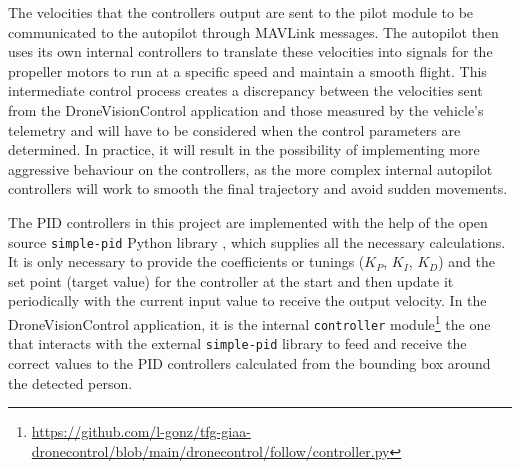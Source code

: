 The velocities that the controllers output are sent to the pilot module to be communicated to the autopilot through MAVLink messages. The autopilot then uses its own internal controllers to translate these velocities into signals for the propeller motors to run at a specific speed and maintain a smooth flight. This intermediate control process creates a discrepancy between the velocities sent from the DroneVisionControl application and those measured by the vehicle's telemetry and will have to be considered when the control parameters are determined. In practice, it will result in the possibility of implementing more aggressive behaviour on the controllers, as the more complex internal autopilot controllers will work to smooth the final trajectory and avoid sudden movements.


The PID controllers in this project are implemented with the help of the open source \texttt{simple-pid} Python library \cite{pid-library}, which supplies all the necessary calculations.
It is only necessary to provide the coefficients or tunings ($K_P$, $K_I$, $K_D$) and the set point (target value) for the controller at the start and then update it periodically with the current input value to receive the output velocity.
In the DroneVisionControl application, it is the internal \texttt{controller} module\footnote{\url{https://github.com/l-gonz/tfg-giaa-dronecontrol/blob/main/dronecontrol/follow/controller.py}} the one that interacts with the external \texttt{simple-pid} library to feed and receive the correct values to the PID controllers calculated from the bounding box around the detected person.

